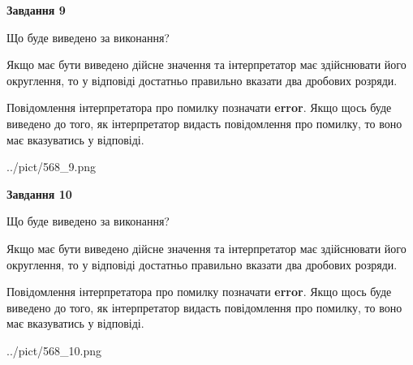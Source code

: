 \documentclass[12pt, ukrainian]{article}
\begin{document}
{\begin {Large}
{\begin {center}\textbf{Завдання 9}\end {center}}\par
Що буде виведено за виконання? \par

Якщо має бути виведено дійсне значення та інтерпретатор має здійснювати його округлення, 
то у відповіді достатньо правильно вказати два дробових розряди.

Повідомлення інтерпретатора про помилку позначати \textbf{error}.
Якщо щось буде виведено до того, як інтерпретатор видасть повідомлення про помилку, 
то воно має вказуватись у відповіді. \par

\begin{center}
	{../pict/568_9.png}
\end{center}
\newpage

{\begin {center}\textbf{Завдання 10}\end {center}}\par
Що буде виведено за виконання? \par

Якщо має бути виведено дійсне значення та інтерпретатор має здійснювати його округлення, 
то у відповіді достатньо правильно вказати два дробових розряди.

Повідомлення інтерпретатора про помилку позначати \textbf{error}.
Якщо щось буде виведено до того, як інтерпретатор видасть повідомлення про помилку, 
то воно має вказуватись у відповіді. \par

\begin{center}
	{../pict/568_10.png}
\end{center}
\newpage

\end {Large}}
\end{document}
